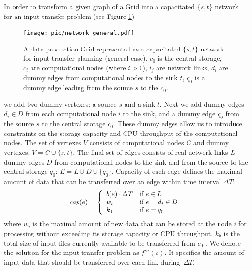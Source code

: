 \documentclass{svjour3}                     %
\begin{document}
In order to transform a given graph of a Grid into a capacitated $\{s,t\}$
network for an input transfer problem (see Figure \ref{network_general})
%
\begin{figure}[b]
	\begin{center}
		\texttt{[image: pic/network\_general.pdf]}
	\end{center}
	\caption{A data production Grid represented as a capacitated $\{s,t\}$ network for input transfer planning (general case). $c_{0}$ is the central storage, $c_{i}$ are computational nodes (where $i>0$), $l_{j}$ are network links, $d_{i}$ are dummy edges from computational nodes to the sink $t$, $q_{0}$ is a dummy edge leading from the source $s$ to the $c_{0}$. }
	\label{network_general}
\end{figure}  
%
 we add two dummy vertexes: a source $s$
and a sink $t$. Next we add  dummy edges $d_{i} \in D$ from each computational
node $i$ to the sink, and a dummy edge $q_{0}$ from the source $s$ to the
central storage $c_{0}$. These dummy edges allow us to introduce constraints
on the storage capacity and CPU throughput of the computational nodes. The set of vertexes $V$ consists of
computational nodes $C$ and dummy vertexes: $V= C \cup \{s,t\}$. The final set
of edges consists of real network links $L$, dummy edges $D$ from
computational nodes to the sink and from the source to the central storage
$q_{0}$: $E= L \cup D \cup \{q_{0}\}$. Capacity of each edge defines the
maximal amount of data that can be transferred over an edge within time
interval $\Delta T$: 
%
\begin{equation} 
\label{edge_cap} 
cap(e) = \left\{
\begin{array}{l l} 
b(e) \cdot \Delta T & \text{if }e \in L \\
 w_{i} & \text{if } e = d_{i} \in D \\
  k_{0} & \text{if } e = q_{0} 
\end{array} \right.
\end{equation} 
%
where $w_{i}$ is the maximal amount of new data that can be
stored at the node $i$ for processing without exceeding its storage capacity or CPU throughput, $k_{0}$ is the total size of input files currently available to be transferred from $c_{0}$ . We denote the solution for the input transfer problem as $f^{in}(e)$. It specifies the amount of input data that should be transferred over each link during~$\Delta T$.
\end{document}
